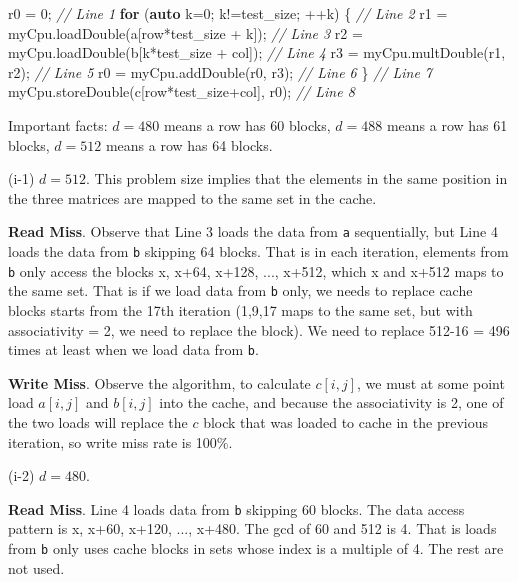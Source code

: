 \documentclass[11pt]{article}
\newenvironment{Shaded}{}{}
\newcommand{\KeywordTok}[1]{\textcolor[rgb]{0.00,0.44,0.13}{\textbf{{#1}}}}
\newcommand{\DecValTok}[1]{\textcolor[rgb]{0.25,0.63,0.44}{{#1}}}
\newcommand{\CommentTok}[1]{\textcolor[rgb]{0.38,0.63,0.69}{\textit{{#1}}}}
\newcommand{\NormalTok}[1]{{#1}}
\newcommand{\ControlFlowTok}[1]{\textcolor[rgb]{0.00,0.44,0.13}{\textbf{{#1}}}}
\begin{document}
\begin{Shaded}
\begin{Highlighting}[]
\NormalTok{      r0 = }\DecValTok{0}\NormalTok{; }\CommentTok{// Line 1}
      \ControlFlowTok{for}\NormalTok{ (}\KeywordTok{auto}\NormalTok{ k=}\DecValTok{0}\NormalTok{; k!=test_size; ++k) \{ }\CommentTok{// Line 2}
\NormalTok{        r1 = myCpu.loadDouble(a[row*test_size + k]); }\CommentTok{// Line 3}
\NormalTok{        r2 = myCpu.loadDouble(b[k*test_size + col]); }\CommentTok{// Line 4}
\NormalTok{        r3 = myCpu.multDouble(r1, r2); }\CommentTok{// Line 5}
\NormalTok{        r0 = myCpu.addDouble(r0, r3); }\CommentTok{// Line 6}
\NormalTok{      \} }\CommentTok{// Line 7}
\NormalTok{      myCpu.storeDouble(c[row*test_size+col], r0); }\CommentTok{// Line 8}
\end{Highlighting}
\end{Shaded}

Important facts: \(d=480\) means a row has 60 blocks, \(d=488\) means a
row has 61 blocks, \(d=512\) means a row has 64 blocks.

(i-1) \(d=512\). This problem size implies that the elements in the same
position in the three matrices are mapped to the same set in the cache.

\textbf{Read Miss}. Observe that Line 3 loads the data from \texttt{a}
sequentially, but Line 4 loads the data from \texttt{b} skipping 64
blocks. That is in each iteration, elements from \texttt{b} only access
the blocks x, x+64, x+128, ..., x+512, which x and x+512 maps to the
same set. That is if we load data from \texttt{b} only, we needs to
replace cache blocks starts from the 17th iteration (1,9,17 maps to the
same set, but with associativity = 2, we need to replace the block). We
need to replace 512-16 = 496 times at least when we load data from
\texttt{b}.

\textbf{Write Miss}. Observe the algorithm, to calculate \(c[i,j]\), we
must at some point load \(a[i,j]\) and \(b[i,j]\) into the cache, and
because the associativity is 2, one of the two loads will replace the
\(c\) block that was loaded to cache in the previous iteration, so write
miss rate is 100\%.

(i-2) \(d=480\).

\textbf{Read Miss}. Line 4 loads data from \texttt{b} skipping 60
blocks. The data access pattern is x, x+60, x+120, ..., x+480. The gcd
of 60 and 512 is 4. That is loads from \texttt{b} only uses cache blocks
in sets whose index is a multiple of 4. The rest are not used.
\end{document}
